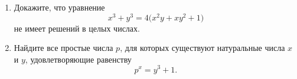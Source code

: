 \begin{enumerate}
\item Докажите, что уравнение
\[
    x^3+y^3=4\bigl(x^2y+xy^2+1\bigr)
\]
не имеет решений в целых числах.

\item Найдите все простые числа $p$, для которых существуют
натуральные числа $x$ и $y$, удовлетворяющие равенству
\[
    p^x=y^3+1.
\]

\end{enumerate}